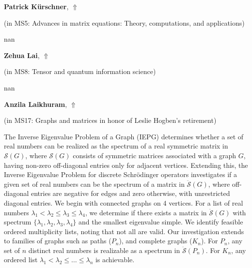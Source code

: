 \documentclass[ILAS2025-program.tex]{subfiles}
\begin{document}
     \hypertarget{down0321}{}\begin{ilasabstract}
    
    \textbf{Patrick Kürschner},  \hfill \hyperlink{up0321}{$\Uparrow$}
    
    (in {\color{mstitle}MS5: Advances in matrix equations: Theory, computations, and applications})
        
        \mtskip
    nan\end{ilasabstract}
     \hypertarget{down0285}{}\begin{ilasabstract}
    
    \textbf{Zehua Lai},  \hfill \hyperlink{up0285}{$\Uparrow$}
    
    (in {\color{mstitle}MS8: Tensor and quantum information science})
        
        \mtskip
    nan\end{ilasabstract}
     \hypertarget{down0223}{}\begin{ilasabstract}
    
    \textbf{Anzila Laikhuram},  \hfill \hyperlink{up0223}{$\Uparrow$}
    
    (in {\color{mstitle}MS17: Graphs and matrices in honor of Leslie Hogben's retirement})
        
        \mtskip
    The Inverse Eigenvalue Problem of a Graph (IEPG) determines whether a set of real numbers can be realized as the spectrum of a real symmetric matrix in $\mathcal{S}(G)$, where $\mathcal{S}(G)$ consists of symmetric matrices associated with a graph $G$, having non-zero off-diagonal entries only for adjacent vertices. Extending this, the Inverse Eigenvalue Problem for discrete Schr\"odinger operators investigates if a given set of real numbers can be the spectrum of a matrix in $\ddot{\mathcal{S}}(G)$, where off-diagonal entries are negative for edges and zero otherwise, with unrestricted diagonal entries. We begin with connected graphs on 4 vertices. For a list of real numbers $\lambda_1 < \lambda_2 \leq \lambda_3 \leq \lambda_4$, we determine if there exists a matrix in $\ddot{\mathcal{S}}(G)$ with spectrum $\{\lambda_1, \lambda_2, \lambda_3, \lambda_4\}$ and the smallest eigenvalue simple. We identify feasible ordered multiplicity lists, noting that not all are valid.   Our investigation extends to families of graphs such as paths ($P_n$), and complete graphs ($K_n$). For $P_n$, any set of $n$ distinct real numbers is realizable as a spectrum in $\ddot{\mathcal{S}}(P_n)$. For $K_n$, any ordered list $\lambda_1 < \lambda_2 \leq \dots \leq \lambda_n$ is achievable. \end{ilasabstract}
\end{document}
